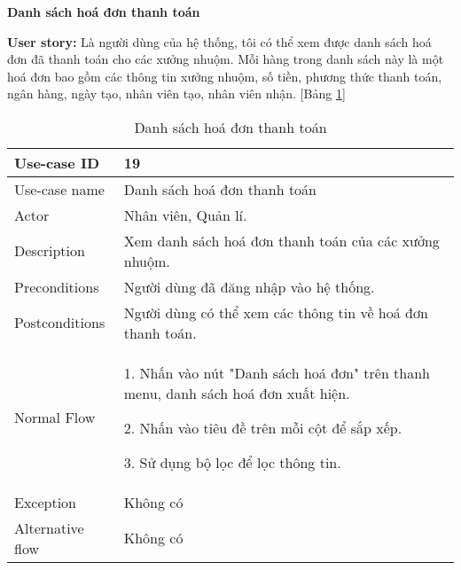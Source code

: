 \textbf{Danh sách hoá đơn thanh toán}\par
\textbf{User story:} Là người dùng của hệ thống, tôi có thể xem được danh sách hoá đơn đã thanh toán cho các xưởng nhuộm. Mỗi hàng trong danh sách này là một hoá đơn bao gồm các thông tin xưởng nhuộm, số tiền, phương thức thanh toán, ngân hàng, ngày tạo, nhân viên tạo, nhân viên nhận. [Bảng \ref{bang19}]
\begin{table}[H]
    \centering
    \begin{tabular}{|m{3cm}|m{10cm}|}
    \hline 
        Use-case ID & 19\\ \hline
        Use-case name & Danh sách hoá đơn thanh toán\\ \hline
        Actor & Nhân viên, Quản lí.\\ \hline
        Description & Xem danh sách hoá đơn thanh toán của các xưởng nhuộm.\\ \hline
        Preconditions & Người dùng đã đăng nhập vào hệ thống.\\ \hline
        Postconditions & Người dùng có thể xem các thông tin về hoá đơn thanh toán.\\ \hline
        Normal Flow & 
        1. Nhấn vào nút "Danh sách hoá đơn" trên thanh menu, danh sách hoá đơn xuất hiện.\par
        2. Nhấn vào tiêu đề trên mỗi cột để sắp xếp.\par
        3. Sử dụng bộ lọc để lọc thông tin.
        \\ \hline
        Exception & Không có\\ \hline
        Alternative flow & Không có\\ 
    \hline 
    \end{tabular}
    \caption{Danh sách hoá đơn thanh toán}
    \label{bang19}
\end{table}

